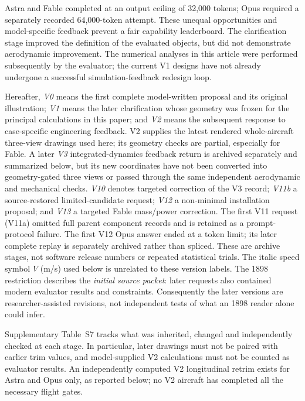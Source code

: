 \documentclass[11pt,a4paper]{article}
\begin{document}
Astra and Fable completed at an output ceiling of 32,000 tokens; Opus required a separately recorded 64,000-token attempt. These unequal opportunities and model-specific feedback prevent a fair capability leaderboard. The clarification stage improved the definition of the evaluated objects, but did not demonstrate aerodynamic improvement. The numerical analyses in this article were performed subsequently by the evaluator; the current V1 designs have not already undergone a successful simulation-feedback redesign loop.

Hereafter, \emph{V0} means the first complete model-written proposal and its original illustration; \emph{V1} means the later clarification whose geometry was frozen for the principal calculations in this paper; and \emph{V2} means the subsequent response to case-specific engineering feedback. V2 supplies the latest rendered whole-aircraft three-view drawings used here; its geometry checks are partial, especially for Fable. A later \emph{V3} integrated-dynamics feedback return is archived separately and summarized below, but its new coordinates have not been converted into geometry-gated three views or passed through the same independent aerodynamic and mechanical checks. \emph{V10} denotes targeted correction of the V3 record; \emph{V11b} a source-restored limited-candidate request; \emph{V12} a non-minimal installation proposal; and \emph{V13} a targeted Fable mass/power correction. The first V11 request (V11a) omitted full parent component records and is retained as a prompt-protocol failure. The first V12 Opus answer ended at a token limit; its later complete replay is separately archived rather than spliced. These are archive stages, not software release numbers or repeated statistical trials. The italic speed symbol $V$ (m/s) used below is unrelated to these version labels. The 1898 restriction describes the \emph{initial source packet}: later requests also contained modern evaluator results and constraints. Consequently the later versions are researcher-assisted revisions, not independent tests of what an 1898 reader alone could infer.

Supplementary Table~S7 tracks what was inherited, changed and independently checked at each stage. In particular, later drawings must not be paired with earlier trim values, and model-supplied V2 calculations must not be counted as evaluator results. An independently computed V2 longitudinal retrim exists for Astra and Opus only, as reported below; no V2 aircraft has completed all the necessary flight gates.
\end{document}
